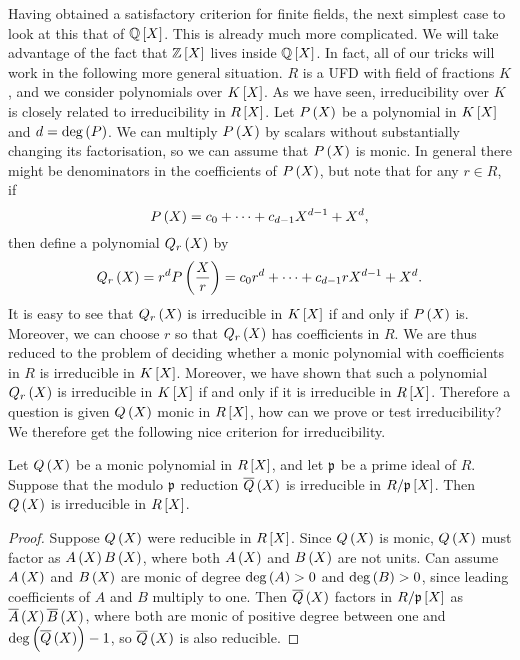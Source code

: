 Having obtained a satisfactory criterion for finite fields, the next simplest case to look at this that of $ \Q\sbr{X} $. This is already much more complicated. We will take advantage of the fact that $ \Z\sbr{X} $ lives inside $ \Q\sbr{X} $. In fact, all of our tricks will work in the following more general situation. $ R $ is a UFD with field of fractions $ K $, and we consider polynomials over $ K\sbr{X} $. As we have seen, irreducibility over $ K $ is closely related to irreducibility in $ R\sbr{X} $. Let $ P\br{X} $ be a polynomial in $ K\sbr{X} $ and $ d = \deg\br{P} $. We can multiply $ P\br{X} $ by scalars without substantially changing its factorisation, so we can assume that $ P\br{X} $ is monic. In general there might be denominators in the coefficients of $ P\br{X} $, but note that for any $ r \in R $, if
$$ P\br{X} = c_0 + \dots + c_{d - 1}X^{d - 1} + X^d, $$
then define a polynomial $ Q_r\br{X} $ by
$$ Q_r\br{X} = r^dP\br{\dfrac{X}{r}} = c_0r^d + \dots + c_{d - 1}rX^{d - 1} + X^d. $$
It is easy to see that $ Q_r\br{X} $ is irreducible in $ K\sbr{X} $ if and only if $ P\br{X} $ is. Moreover, we can choose $ r $ so that $ Q_r\br{X} $ has coefficients in $ R $. We are thus reduced to the problem of deciding whether a monic polynomial with coefficients in $ R $ is irreducible in $ K\sbr{X} $. Moreover, we have shown that such a polynomial $ Q_r\br{X} $ is irreducible in $ K\sbr{X} $ if and only if it is irreducible in $ R\sbr{X} $. Therefore a question is given $ Q\br{X} $ monic in $ R\sbr{X} $, how can we prove or test irreducibility? We therefore get the following nice criterion for irreducibility.

\pagebreak

\begin{proposition}
Let $ Q\br{X} $ be a monic polynomial in $ R\sbr{X} $, and let $ \mathfrak{p} $ be a prime ideal of $ R $. Suppose that the modulo $ \mathfrak{p} $ reduction $ \overline{Q}\br{X} $ is irreducible in $ R / \pp\sbr{X} $. Then $ Q\br{X} $ is irreducible in $ R\sbr{X} $.
\end{proposition}

\begin{proof}
Suppose $ Q\br{X} $ were reducible in $ R\sbr{X} $. Since $ Q\br{X} $ is monic, $ Q\br{X} $ must factor as $ A\br{X}B\br{X} $, where both $ A\br{X} $ and $ B\br{X} $ are not units. Can assume $ A\br{X} $ and $ B\br{X} $ are monic of degree $ \deg\br{A} > 0 $ and $ \deg\br{B} > 0 $, since leading coefficients of $ A $ and $ B $ multiply to one. Then $ \overline{Q}\br{X} $ factors in $ R / \pp\sbr{X} $ as $ \overline{A}\br{X}\overline{B}\br{X} $, where both are monic of positive degree between one and $ \deg\br{\overline{Q}\br{X}} - 1 $, so $ \overline{Q}\br{X} $ is also reducible.
\end{proof}

